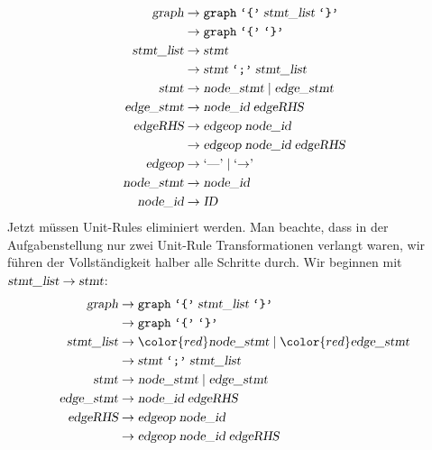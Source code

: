 \begin{loesung}
\begin{teilaufgaben}
\begin{align*}
\textsl{graph}     &\rightarrow \texttt{graph}\; \texttt{`\{'}\; \textsl{stmt\_list}\; \texttt{`\}'} \\
                   &\rightarrow \texttt{graph}\; \texttt{`\{'}\; \texttt{`\}'} \\
\textsl{stmt\_list}&\rightarrow \textsl{stmt}\\
                   &\rightarrow \textsl{stmt}\; \texttt{`;'}\; \textsl{stmt\_list}\\
\textsl{stmt}      &\rightarrow \textsl{node\_stmt}\; |\;
                                \textsl{edge\_stmt} \\
\textsl{edge\_stmt}&\rightarrow \textsl{node\_id}\; \textsl{edgeRHS} \\
\textsl{edgeRHS}   &\rightarrow \textsl{edgeop}\; \textsl{node\_id}\\
                   &\rightarrow \textsl{edgeop}\; \textsl{node\_id}\; \textsl{edgeRHS}\\
\textsl{edgeop}    &\rightarrow \textrm{`\text{---}'}\; |\; \textrm{`$\rightarrow$'}\; \\
\textsl{node\_stmt}&\rightarrow \textsl{node\_id} \\
\textsl{node\_id}  &\rightarrow \textsl{ID}
\end{align*}
Jetzt müssen Unit-Rules eliminiert werden. Man beachte, dass in der Aufgabenstellung
nur zwei Unit-Rule Transformationen verlangt waren, wir führen der Vollständigkeit
halber alle Schritte durch.
Wir beginnen mit $\textsl{stmt\_list}\to\textsl{stmt}$:
\begin{align*}
\textsl{graph}     &\rightarrow \texttt{graph}\; \texttt{`\{'}\; \textsl{stmt\_list}\; \texttt{`\}'} \\
                   &\rightarrow \texttt{graph}\; \texttt{`\{'}\; \texttt{`\}'} \\
\textsl{stmt\_list}&\rightarrow {\color{red}\textsl{node\_stmt}}\; |\;
                                {\color{red}\textsl{edge\_stmt}} \\
                   &\rightarrow \textsl{stmt}\; \texttt{`;'}\; \textsl{stmt\_list}\\
\textsl{stmt}      &\rightarrow \textsl{node\_stmt}\; |\;
                                \textsl{edge\_stmt} \\
\textsl{edge\_stmt}&\rightarrow \textsl{node\_id}\; \textsl{edgeRHS} \\
\textsl{edgeRHS}   &\rightarrow \textsl{edgeop}\; \textsl{node\_id}\\
                   &\rightarrow \textsl{edgeop}\; \textsl{node\_id}\; \textsl{edgeRHS}\\

\end{align*}
\end{teilaufgaben}
\end{loesung}
